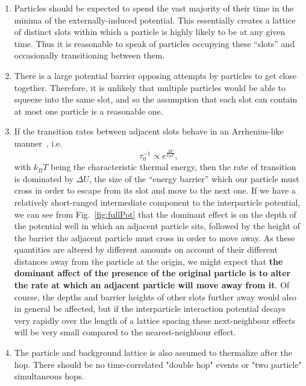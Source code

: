 \begin{enumerate}
\item Particles should be expected to spend the vast majority of their time in the minima of the 
externally-induced potential. This essentially creates a lattice of distinct slots within which a
particle
is highly likely to be at any given time. Thus it is reasonable to speak of particles occupying these 
``slots'' and occasionally transitioning between them.
 \item There is a large potential barrier opposing attempts by particles to get close together. Therefore,
 it is unlikely that multiple particles would be able to squeeze into the same slot,
 and so the assumption that each slot can contain at most one particle is a reasonable one.
 \item If the transition rates between adjacent slots behave in an Arrhenius-like manner~\cite{arrhenius1889, levine2005}, i.e.
 \begin{equation}
  \tau_0^{-1} \propto e^{\frac{\Delta U}{k_B T}},
 \end{equation}
 with $k_B T$ being the characteristic thermal energy,
then the rate of transition is dominated by $\Delta U$, the size of the ``energy barrier'' which
our particle must cross in order to escape from its slot and move to the next one. If we have a relatively
short-ranged intermediate component to the interparticle potential, we can see from Fig.~\ref{fig:fullPot}
that the dominant effect is on the depth of the potential well in which an adjacent particle sits, followed
by the height of the barrier the adjacent particle must cross in order to move away. As these
quantities are altered by different amounts on account of their different distances away from the particle
at the origin, we might expect that \textbf{the dominant affect of the presence of the original particle is
to alter the rate at which an adjacent particle will move away from it}. Of course, the depths and barrier
heights of other slots further away would also in general be affected, but if the interparticle interaction potential decays very rapidly over the length of a lattice spacing these next-neighbour effects will be
very small compared to the nearest-neighbour effect.
\item The particle and background lattice is also assumed to thermalize
after the hop. There 
should be no time-correlated "double hop" events or "two particle"
simultaneous hops.
\end{enumerate}

